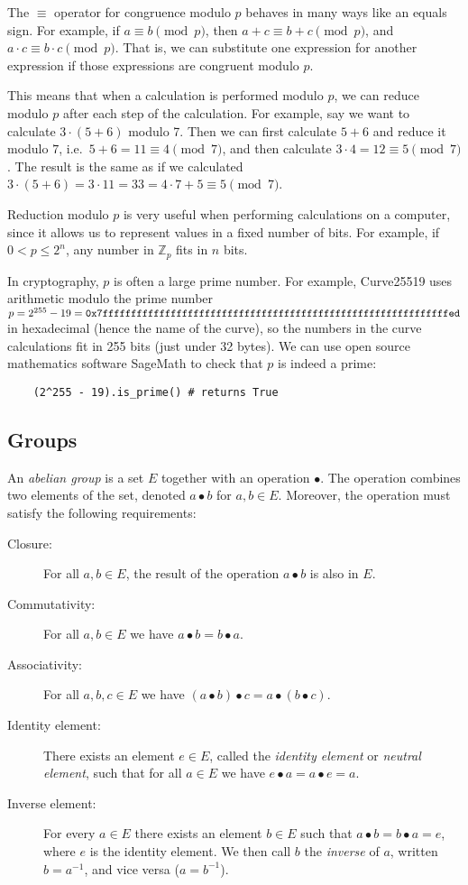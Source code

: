 \documentclass[manuscript]{acmart}
\begin{document}
The $\equiv$ operator for congruence modulo $p$ behaves in many ways like an equals sign.
For example, if $a \equiv b \pmod{p}$, then $a+c \equiv b+c \pmod{p}$, and $a \cdot c \equiv b \cdot c \pmod{p}$.
That is, we can substitute one expression for another expression if those expressions are congruent modulo $p$.

This means that when a calculation is performed modulo $p$, we can reduce modulo $p$ after each step of the calculation.
For example, say we want to calculate $3 \cdot (5 + 6)$ modulo 7.
Then we can first calculate $5+6$ and reduce it modulo $7$, i.e.\ $5+6 = 11 \equiv 4 \pmod{7}$, and then calculate $3 \cdot 4 = 12 \equiv 5 \pmod{7}
$.
The result is the same as if we calculated $3 \cdot (5 + 6) = 3 \cdot 11 = 33 = 4 \cdot 7 + 5 \equiv 5 \pmod{7}$.

Reduction modulo $p$ is very useful when performing calculations on a computer, since it allows us to represent values in a fixed number of bits.
For example, if $0 < p \le 2^n$, any number in $\mathbb{Z}_p$ fits in $n$ bits.

In cryptography, $p$ is often a large prime number.
For example, Curve25519 uses arithmetic modulo the prime number $p=2^{255}-19=\verb|0x7fffffffffffffffffffffffffffffffffffffffffffffffffffffffffffffed|$ in hexadecimal (hence the name of the curve), so the numbers in the curve calculations fit in 255 bits (just under 32 bytes).
We can use open source mathematics software SageMath to check that $p$ is indeed a prime:
\begin{verbatim}
    (2^255 - 19).is_prime() # returns True
\end{verbatim}

\subsection{Groups}\label{sec:groups}

An \emph{abelian group} is a set $E$ together with an operation $\bullet$.
The operation combines two elements of the set, denoted $a \bullet b$ for $a, b \in E$.
Moreover, the operation must satisfy the following requirements:
\begin{description}
\item[Closure:] For all $a, b \in E$, the result of the operation $a \bullet b$ is also in $E$.
\item[Commutativity:] For all $a, b \in E$ we have $a \bullet b = b \bullet a$.
\item[Associativity:] For all $a, b, c \in E$ we have $(a \bullet b) \bullet c = a \bullet (b \bullet c)$.
\item[Identity element:] There exists an element $e \in E$, called the \emph{identity element} or \emph{neutral element}, such that for all $a \in E$ we have $e \bullet a = a \bullet e = a$.
\item[Inverse element:] For every $a \in E$ there exists an element $b \in E$ such that $a \bullet b = b \bullet a = e$, where $e$ is the identity element. We then call $b$ the \emph{inverse} of $a$, written $b = a^{-1}$, and vice versa ($a = b^{-1}$).
\end{description}
\end{document}
